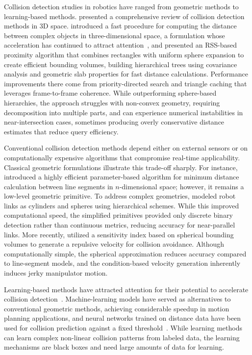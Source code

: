 Collision detection studies in robotics have ranged from geometric methods to learning-based
methods. \citet{jimenez2001collision} presented a comprehensive review of collision detection
methods in 3D space. \citet{gilbert1988fast} introduced a fast procedure for computing the distance
between complex objects in three-dimensional space, a formulation whose acceleration has continued
to attract attention~\citep{montaut2024gjk}, and \citet{larsen2000fast} presented an RSS-based
proximity algorithm that combines rectangles with uniform sphere expansion to create efficient
bounding volumes, building hierarchical trees using covariance analysis and geometric slab
properties for fast distance calculations. Performance improvements there come from
priority-directed search and triangle caching that leverages frame-to-frame coherence. While
outperforming sphere-based hierarchies, the approach struggles with non-convex geometry, requiring
decomposition into multiple parts, and can experience numerical instabilities in near-intersection
cases, sometimes producing overly conservative distance estimates that reduce query
efficiency.

Conventional collision detection methods depend either on external sensors or on computationally expensive algorithms that compromise real-time applicability. Classical geometric formulations illustrate this trade-off sharply. For instance, \citet{lumelsky1985fast} introduced a highly efficient parameter-based algorithm for minimum distance calculation between line segments in $n$-dimensional space; however, it remains a low-level geometric primitive. To address complex geometries, \citet{chang1990collision} modeled robot links as cylinders and spheres using hierarchical schemes. While this improved computational speed, the simplified primitives provided only discrete binary detection rather than continuous metrics, reducing accuracy for near-parallel links. More recently, \citet{lei2020real} utilized a sensitivity index based on spherical bounding volumes to generate a repulsive velocity for collision avoidance. Although computationally simple, the spherical approximation reduces accuracy compared to line-segment models, and the condition-based velocity generation inherently induces jerky manipulator motion.

Learning-based methods have attracted attention for their potential to accelerate collision
detection~\citep{das2020learning}. Machine-learning models have served as alternatives to conventional geometric methods, achieving considerable speedup in motion planning applications, and neural networks trained on distance data have been used for collision prediction against a fixed threshold~\citep{kramar2022self}. While learning methods can learn complex non-linear collision patterns from labeled data, the learning mechanisms are black boxes and need large amounts of data for learning.

